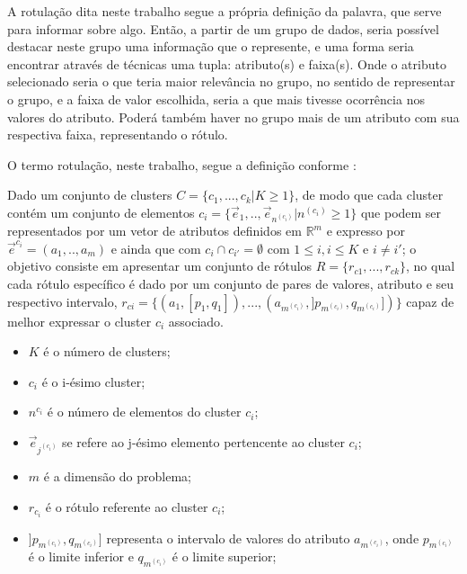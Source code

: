 A rotulação dita neste trabalho segue a própria definição da palavra, que serve para informar sobre algo. Então, a partir de um grupo de dados, seria possível destacar neste grupo uma informação que o represente, e uma forma seria encontrar através de técnicas uma tupla: atributo(s) e faixa(s). Onde o atributo selecionado seria o que teria maior relevância no grupo, no sentido de representar o grupo, e a faixa de valor escolhida, seria a que mais tivesse ocorrência nos valores do atributo. Poderá também haver no grupo mais de um atributo com sua respectiva faixa, representando o rótulo.


O termo rotulação, neste trabalho, segue a definição conforme \cite{LOPES2014}: 

    \begin{teorema}
Dado um conjunto de clusters ${C=\{c_1,...,c_k | K \geqslant 1\} }$, de modo que cada cluster contém um conjunto de elementos ${c_i=\{\vec{e}_1,..,\vec{e}_{n^{(c_i)}}|n^{(c_i)} \geqslant 1 \}}$ que podem ser representados por um vetor de atributos definidos em ${\mathbb{R}^m }$ e expresso por ${ \vec{e}^{c_i}=(a_1,..,a_m)  }$ e ainda que  com ${ c_i \cap c_{i'}=\emptyset }$ com ${ 1 \leqslant i, i \leqslant K  }$ e ${ i \neq i' }$; o objetivo consiste em apresentar um conjunto de rótulos ${ R=\{ r_{c1},...,r_{ck} \} }$, no qual cada rótulo específico é dado por um conjunto de pares de valores, atributo e seu respectivo intervalo, ${ r_{ci}=\{ (a_1,[p_1,q_1]),...,(a_{m^{(c_i)}}, ]p_{m^{(c_i)}},q_{m^{(c_i)}}]) \} }$ capaz de melhor expressar o cluster ${c_i}$ associado.
        \begin{itemize}[noitemsep]
            \item ${K}$ é o número de clusters;
            \item ${c_i}$ é o i-ésimo cluster;
            \item ${n^{c_i}}$ é o número de elementos do cluster ${c_i}$;
            \item ${\vec{e}_{j^{(c_i)}}}$ se refere ao j-ésimo elemento pertencente ao cluster ${c_i}$;
            \item ${m}$ é a dimensão do problema;
            \item ${r_{c_i}}$ é o rótulo referente ao cluster ${c_i}$;
            \item ${]p_{m^{(c_i)}},q_{m^{(c_i)}}]}$ representa o intervalo de valores do atributo ${a_{m^{(c_i)}} }$, onde ${ p_{m^{(c_i)}} }$  é o limite inferior e ${ q_{m^{(c_i)}} }$ é o limite superior;
        \end{itemize}
    \label{teo:lopes:problema}
    \end{teorema}


